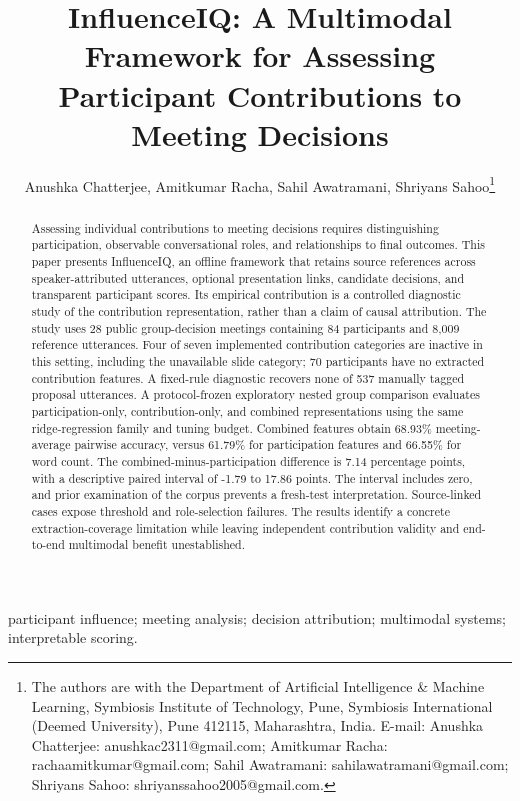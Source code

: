 \documentclass[journal]{IEEEtran}
\begin{document}
\ifdefined\pdfinfo{}\else{}\fi
\title{InfluenceIQ: A Multimodal Framework for Assessing Participant Contributions to Meeting Decisions}
\author{Anushka Chatterjee, Amitkumar Racha, Sahil Awatramani, Shriyans Sahoo\thanks{The authors are with the Department of Artificial Intelligence \& Machine Learning, Symbiosis Institute of Technology, Pune, Symbiosis International (Deemed University), Pune 412115, Maharashtra, India. E-mail: Anushka Chatterjee: \mbox{anushkac2311@gmail.com}; Amitkumar Racha: \mbox{rachaamitkumar@gmail.com}; Sahil Awatramani: \mbox{sahilawatramani@gmail.com}; Shriyans Sahoo: \mbox{shriyanssahoo2005@gmail.com}.}}
\maketitle
\begin{abstract}Assessing individual contributions to meeting decisions requires distinguishing participation, observable conversational roles, and relationships to final outcomes. This paper presents InfluenceIQ, an offline framework that retains source references across speaker-attributed utterances, optional presentation links, candidate decisions, and transparent participant scores. Its empirical contribution is a controlled diagnostic study of the contribution representation, rather than a claim of causal attribution. The study uses 28 public group-decision meetings containing 84 participants and 8,009 reference utterances. Four of seven implemented contribution categories are inactive in this setting, including the unavailable slide category; 70 participants have no extracted contribution features. A fixed-rule diagnostic recovers none of 537 manually tagged proposal utterances. A protocol-frozen exploratory nested group comparison evaluates participation-only, contribution-only, and combined representations using the same ridge-regression family and tuning budget. Combined features obtain 68.93\% meeting-average pairwise accuracy, versus 61.79\% for participation features and 66.55\% for word count. The combined-minus-participation difference is 7.14 percentage points, with a descriptive paired interval of -1.79 to 17.86 points. The interval includes zero, and prior examination of the corpus prevents a fresh-test interpretation. Source-linked cases expose threshold and role-selection failures. The results identify a concrete extraction-coverage limitation while leaving independent contribution validity and end-to-end multimodal benefit unestablished.\end{abstract}
\begin{IEEEkeywords}participant influence; meeting analysis; decision attribution; multimodal systems; interpretable scoring.\end{IEEEkeywords}
\end{document}
